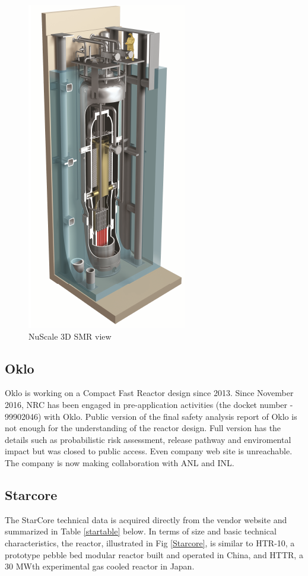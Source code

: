 \documentclass[10pt,a4paper]{article}
\begin{document}
\begin{figure}[htbp]
\centering
\includegraphics[scale=0.8]{Figs/nuscale3d.jpeg}
\caption{NuScale 3D SMR view}
\label{Nu3d}
\end{figure}

\pagebreak
\subsection{Oklo}
Oklo is working on a Compact Fast Reactor design since 2013. Since November 2016, NRC has been engaged in pre-application activities (the docket number - 99902046) with Oklo. Public version of the final safety analysis report of Oklo \cite{Oklofsar} is not enough for the understanding of the reactor design. Full version has the details such as probabilistic risk assessment, release pathway and enviromental impact but was closed to public access. Even company web site is unreachable. The company is now making collaboration with ANL and INL. 

\subsection{Starcore}
The StarCore technical data is acquired directly from the vendor website and summarized in Table \ref{startable} below. In terms of size and basic technical characteristics, the reactor, illustrated in Fig \ref{Starcore}, is similar to HTR-10, a prototype pebble bed modular reactor built and operated in China, and HTTR, a 30 MWth experimental gas cooled reactor in Japan.
\end{document}
